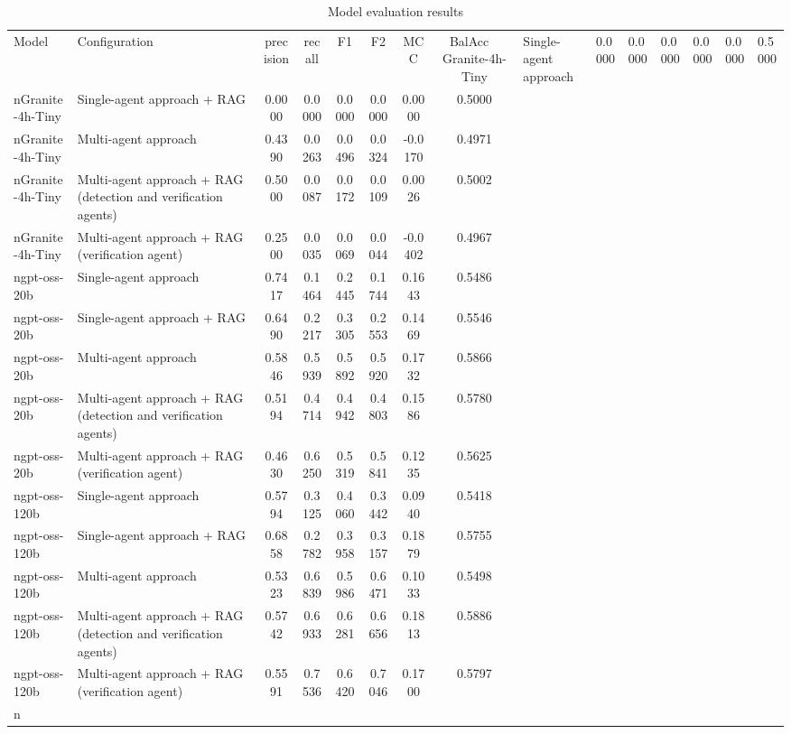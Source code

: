 \begin{table}[htbp]
\centering
\caption{Model evaluation results}
\label{tab:results}
\begin{tabular}{llcccccc}
\toprule
Model & Configuration & precision & recall & F1 & F2 & MCC & BalAcc \
\midrule
Granite-4h-Tiny & Single-agent approach & 0.0000 & 0.0000 & 0.0000 & 0.0000 & 0.0000 & 0.5000 \\nGranite-4h-Tiny & Single-agent approach + RAG & 0.0000 & 0.0000 & 0.0000 & 0.0000 & 0.0000 & 0.5000 \\nGranite-4h-Tiny & Multi-agent approach & 0.4390 & 0.0263 & 0.0496 & 0.0324 & -0.0170 & 0.4971 \\nGranite-4h-Tiny & Multi-agent approach + RAG (detection and verification agents) & 0.5000 & 0.0087 & 0.0172 & 0.0109 & 0.0026 & 0.5002 \\nGranite-4h-Tiny & Multi-agent approach + RAG (verification agent) & 0.2500 & 0.0035 & 0.0069 & 0.0044 & -0.0402 & 0.4967 \\ngpt-oss-20b & Single-agent approach & 0.7417 & 0.1464 & 0.2445 & 0.1744 & 0.1643 & 0.5486 \\ngpt-oss-20b & Single-agent approach + RAG & 0.6490 & 0.2217 & 0.3305 & 0.2553 & 0.1469 & 0.5546 \\ngpt-oss-20b & Multi-agent approach & 0.5846 & 0.5939 & 0.5892 & 0.5920 & 0.1732 & 0.5866 \\ngpt-oss-20b & Multi-agent approach + RAG (detection and verification agents) & 0.5194 & 0.4714 & 0.4942 & 0.4803 & 0.1586 & 0.5780 \\ngpt-oss-20b & Multi-agent approach + RAG (verification agent) & 0.4630 & 0.6250 & 0.5319 & 0.5841 & 0.1235 & 0.5625 \\ngpt-oss-120b & Single-agent approach & 0.5794 & 0.3125 & 0.4060 & 0.3442 & 0.0940 & 0.5418 \\ngpt-oss-120b & Single-agent approach + RAG & 0.6858 & 0.2782 & 0.3958 & 0.3157 & 0.1879 & 0.5755 \\ngpt-oss-120b & Multi-agent approach & 0.5323 & 0.6839 & 0.5986 & 0.6471 & 0.1033 & 0.5498 \\ngpt-oss-120b & Multi-agent approach + RAG (detection and verification agents) & 0.5742 & 0.6933 & 0.6281 & 0.6656 & 0.1813 & 0.5886 \\ngpt-oss-120b & Multi-agent approach + RAG (verification agent) & 0.5591 & 0.7536 & 0.6420 & 0.7046 & 0.1700 & 0.5797 \\n\bottomrule
\end{tabular}
\end{table}
